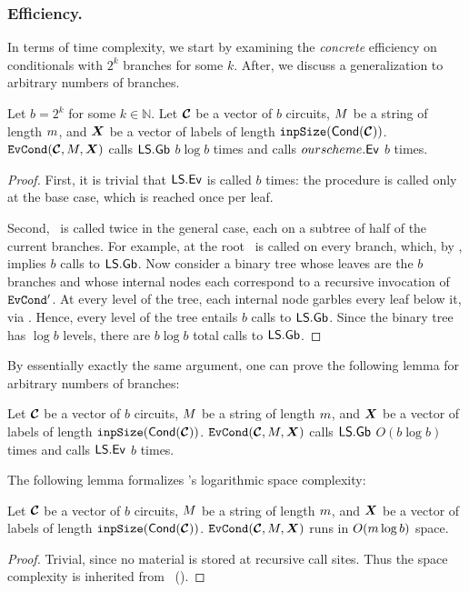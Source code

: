 \subsubsection{\evcond Efficiency.}
In terms of time complexity, we start by examining the \emph{concrete}
efficiency on conditionals with $2^k$ branches for some $k$.
%
After, we discuss a generalization to arbitrary numbers of branches.

\begin{lemma}\label{lemma:evcondtime}
  Let $b = 2^k$ for some $k \in \mathbb{N}$.
  Let $\vec{\cir}$ be a vector of $b$ circuits, $M$ be a string of
  length $m$, and $\gcirinp$ be a vector of labels of length
  $\inpsize(\conditional(\vec{\cir}))$.
  $\evcond(\vec{\cir}, \mat, \gcirinp)$ calls $\textsf{LS}.\textsf{Gb}$ $b \log b$ times
  and calls $ourscheme.\textsf{Ev}$ $b$ times.
\end{lemma}
\begin{proof}
  First, it is trivial that $\textsf{LS}.\textsf{Ev}$ is called $b$ times: the
  procedure is called only at the base case, which is reached once per
  leaf.

  Second, \gbtree\ is called twice in the general case, each on a
  subtree of half of the current branches.
  For example, at the root \gbtree\ is called on every branch, which, by
  , implies $b$ calls to $\textsf{LS}.\mathsf{Gb}$.
  Now consider a binary tree whose leaves are the $b$
  branches and whose internal nodes each correspond to
  a recursive invocation of $\mathtt{EvCond}'$.
  At every level of the tree, each internal node garbles every
  leaf below it, via \gbtree.
  Hence, every level of the tree entails $b$ calls to $\textsf{LS}.\mathsf{Gb}$.
  Since the binary tree has $\log b$ levels, there are $b
  \log b$ total calls to $\textsf{LS}.\mathsf{Gb}$.
\end{proof}

By essentially exactly the same argument, one can prove the following
lemma for arbitrary numbers of branches:
\begin{lemma}\label{lemma:evcondtime-general}
  Let $\vec{\cir}$ be a vector of $b$ circuits, $M$ be a string of
  length $m$, and $\gcirinp$ be a vector of labels of length
  $\inpsize(\conditional(\vec{\cir}))$.
  $\evcond(\vec{\cir}, \mat, \gcirinp)$ calls $\textsf{LS}.\textsf{Gb}$ $O(b \log b)$ times
  and calls $\textsf{LS}.\textsf{Ev}$ $b$ times.
\end{lemma}

The following lemma formalizes \evcond's logarithmic space complexity:
\begin{lemma}\label{lemma:evcondspace}
  Let $\vec{\cir}$ be a vector of $b$ circuits, $M$ be a string of
  length $m$, and $\gcirinp$ be a vector of labels of length
  $\inpsize(\conditional(\vec{\cir}))$.
  $\evcond(\vec{\cir}, \mat, \gcirinp)$ runs in $O(m \log b)$ space.
\end{lemma}
\begin{proof}
  Trivial, since no material is stored at recursive call sites.
  Thus the space complexity is inherited from
  \gbtree~().
\end{proof}



